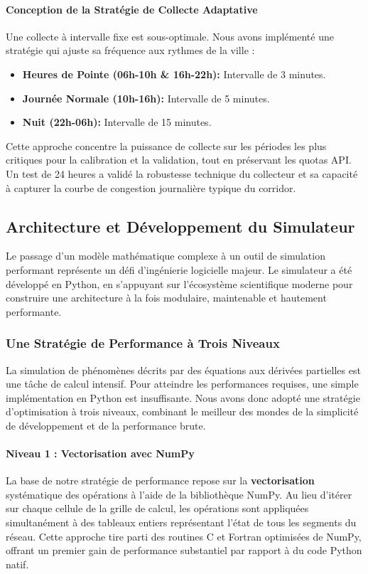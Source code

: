\paragraph{Conception de la Stratégie de Collecte Adaptative}
Une collecte à intervalle fixe est sous-optimale. Nous avons implémenté une stratégie qui ajuste sa fréquence aux rythmes de la ville :
\begin{itemize}
       \item \textbf{Heures de Pointe (06h-10h \& 16h-22h):} Intervalle de 3 minutes.
       \item \textbf{Journée Normale (10h-16h):} Intervalle de 5 minutes.
       \item \textbf{Nuit (22h-06h):} Intervalle de 15 minutes.
\end{itemize}
Cette approche concentre la puissance de collecte sur les périodes les plus critiques pour la calibration et la validation, tout en préservant les quotas API. Un test de 24 heures a validé la robustesse technique du collecteur et sa capacité à capturer la courbe de congestion journalière typique du corridor.

\subsection{Architecture et Développement du Simulateur}
\label{sec:simulator_architecture}

Le passage d'un modèle mathématique complexe à un outil de simulation performant représente un défi d'ingénierie logicielle majeur. Le simulateur a été développé en Python, en s'appuyant sur l'écosystème scientifique moderne pour construire une architecture à la fois modulaire, maintenable et hautement performante.

\subsubsection{Une Stratégie de Performance à Trois Niveaux}
La simulation de phénomènes décrits par des équations aux dérivées partielles est une tâche de calcul intensif. Pour atteindre les performances requises, une simple implémentation en Python est insuffisante. Nous avons donc adopté une stratégie d'optimisation à trois niveaux, combinant le meilleur des mondes de la simplicité de développement et de la performance brute.

\paragraph{Niveau 1 : Vectorisation avec NumPy}
La base de notre stratégie de performance repose sur la \textbf{vectorisation} systématique des opérations à l'aide de la bibliothèque NumPy. Au lieu d'itérer sur chaque cellule de la grille de calcul, les opérations sont appliquées simultanément à des tableaux entiers représentant l'état de tous les segments du réseau. Cette approche tire parti des routines C et Fortran optimisées de NumPy, offrant un premier gain de performance substantiel par rapport à du code Python natif.

